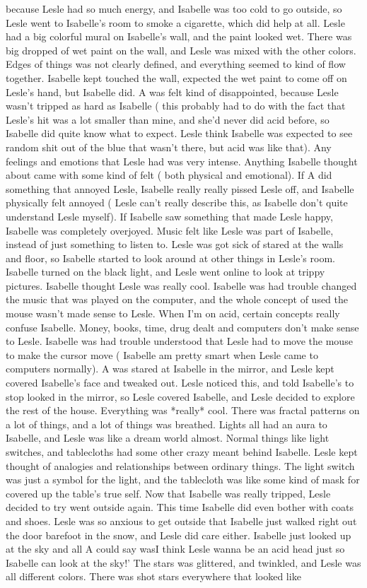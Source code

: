 \documentclass[12pt]{book}
\begin{document}
because Lesle had so much energy, and Isabelle was too cold to go outside, so Lesle went to Isabelle's room to smoke a cigarette, which did help at all. Lesle had a big colorful mural on Isabelle's wall, and the paint looked wet. There was big dropped of wet paint on the wall, and Lesle was mixed with the other colors. Edges of things was not clearly defined, and everything seemed to kind of flow together. Isabelle kept touched the wall, expected the wet paint to come off on Lesle's hand, but Isabelle did. A was felt kind of disappointed, because Lesle wasn't tripped as hard as Isabelle ( this probably had to do with the fact that Lesle's hit was a lot smaller than mine, and she'd never did acid before, so Isabelle did quite know what to expect. Lesle think Isabelle was expected to see random shit out of the blue that wasn't there, but acid was like that). Any feelings and emotions that Lesle had was very intense. Anything Isabelle thought about came with some kind of felt ( both physical and emotional). If A did something that annoyed Lesle, Isabelle really really pissed Lesle off, and Isabelle physically felt annoyed ( Lesle can't really describe this, as Isabelle don't quite understand Lesle myself). If Isabelle saw something that made Lesle happy, Isabelle was completely overjoyed. Music felt like Lesle was part of Isabelle, instead of just something to listen to. Lesle was got sick of stared at the walls and floor, so Isabelle started to look around at other things in Lesle's room. Isabelle turned on the black light, and Lesle went online to look at trippy pictures. Isabelle thought Lesle was really cool. Isabelle was had trouble changed the music that was played on the computer, and the whole concept of used the mouse wasn't made sense to Lesle. When I'm on acid, certain concepts really confuse Isabelle. Money, books, time, drug dealt and computers don't make sense to Lesle. Isabelle was had trouble understood that Lesle had to move the mouse to make the cursor move ( Isabelle am pretty smart when Lesle came to computers normally). A was stared at Isabelle in the mirror, and Lesle kept covered Isabelle's face and tweaked out. Lesle noticed this, and told Isabelle's to stop looked in the mirror, so Lesle covered Isabelle, and Lesle decided to explore the rest of the house. Everything was *really* cool. There was fractal patterns on a lot of things, and a lot of things was breathed. Lights all had an aura to Isabelle, and Lesle was like a dream world almost. Normal things like light switches, and tablecloths had some other crazy meant behind Isabelle. Lesle kept thought of analogies and relationships between ordinary things. The light switch was just a symbol for the light, and the tablecloth was like some kind of mask for covered up the table's true self. Now that Isabelle was really tripped, Lesle decided to try went outside again. This time Isabelle did even bother with coats and shoes. Lesle was so anxious to get outside that Isabelle just walked right out the door barefoot in the snow, and Lesle did care either. Isabelle just looked up at the sky and all A could say wasI think Lesle wanna be an acid head just so Isabelle can look at the sky!' The stars was glittered, and twinkled, and Lesle was all different colors. There was shot stars everywhere that looked like 
\end{document}
